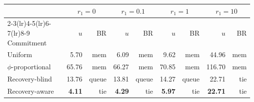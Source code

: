 \footnotesize
\setlength{\tabcolsep}{2.4pt}
\begin{tabular}{@{}l rr rr rr rr@{}}
\toprule
 & \multicolumn{2}{c}{$r_1=0$} & \multicolumn{2}{c}{$r_1=0.1$} & \multicolumn{2}{c}{$r_1=1$} & \multicolumn{2}{c}{$r_1=10$} \\
\cmidrule(lr){2-3}\cmidrule(lr){4-5}\cmidrule(lr){6-7}\cmidrule(lr){8-9}
Commitment & $u$ & BR & $u$ & BR & $u$ & BR & $u$ & BR \\
\midrule
Uniform & 5.70 & mem & 6.09 & mem & 9.62 & mem & 44.96 & mem \\
$\phi$-proportional & 65.76 & mem & 66.27 & mem & 70.85 & mem & 116.70 & mem \\
Recovery-blind & 13.76 & queue & 13.81 & queue & 14.27 & queue & 22.71 & tie \\
Recovery-aware & \textbf{4.11} & tie & \textbf{4.29} & tie & \textbf{5.97} & tie & \textbf{22.71} & tie \\
\bottomrule
\end{tabular}
